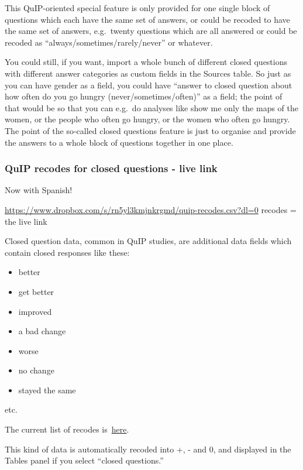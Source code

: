 \documentclass[
]{book}
\providecommand{\tightlist}{%
  \setlength{\itemsep}{0pt}\setlength{\parskip}{0pt}}
\begin{document}
This QuIP-oriented special feature is only provided for one single block of questions which each have the same set of answers, or could be recoded to have the same set of answers, e.g.~twenty questions which are all answered or could be recoded as ``always/sometimes/rarely/never'' or whatever.

You could still, if you want, import a whole bunch of different closed questions with different answer categories as custom fields in the Sources table. So just as you can have gender as a field, you could have ``answer to closed question about how often do you go hungry (never/sometimes/often)'' as a field; the point of that would be so that you can e.g.~do analyses like show me only the maps of the women, or the people who often go hungry, or the women who often go hungry. The point of the so-called closed questions feature is just to organise and provide the answers to a whole block of questions together in one place.

\hypertarget{quip-recodes-for-closed-questions---live-link}{%
\subsubsection{QuIP recodes for closed questions - live link}\label{quip-recodes-for-closed-questions---live-link}}

Now with Spanish!

\url{https://www.dropbox.com/s/rn5yl3kmjnkrgmd/quip-recodes.csv?dl=0} recodes = the live link

Closed question data, common in QuIP studies, are additional data fields which contain closed responses like these:

\begin{itemize}
\tightlist
\item
  better
\item
  get better
\item
  improved
\item
  a bad change
\item
  worse
\item
  no change
\item
  stayed the same
\end{itemize}

etc.

The current list of recodes is~\href{https://www.dropbox.com/s/j8mn0i7w2ahtw56/quip-recodes.csv?dl=0}{here}.

This kind of data is automatically recoded into +, - and 0, and displayed in the Tables panel if you select ``closed questions.''
\end{document}
